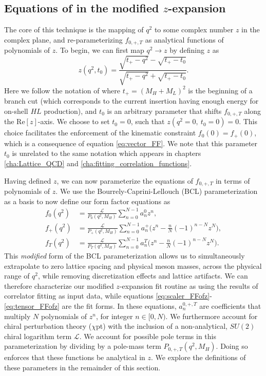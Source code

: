 \subsection{Equations of in the modified $z$-expansion}
The core of this technique is the mapping of $q^2$ to some complex number $z$ in the complex plane, and re-parameterizing $f_{0,+,T}$ as analytical functions of polynomials of $z$.  To begin, we can first map $q^2\rightarrow z$ by defining $z$ as 
\begin{equation}\label{eq:zofq}
  z(q^2,t_0)=\frac{\sqrt{t_+-q^2}-\sqrt{t_+-t_0}}{\sqrt{t_+-q^2}+\sqrt{t_+-t_0}}.
\end{equation}
Here we follow the notation of \cite{boyd1995modelindependentdeterminationsb, PhysRevD.79.013008, PhysRevLett.95.071802} where $t_+ = (M_H + M_L)^2$ is the beginning of a branch cut (which corresponds to the current insertion having enough energy for on-shell $HL$ production), and $t_0$ is an arbitrary parameter that shifts $f_{0,+,T}$ along the $\mathrm{Re}[z]$-axis.  We choose to set $t_0 = 0$, such that $z(q^2 = 0, \ t_0=0) = 0$.  This choice facilitates the enforcement of the kinematic constraint $f_0(0) = f_+(0)$, which is a consequence of equation \ref{eq:vector_FF}.  We note that this parameter $t_0$ is unrelated to the same notation which appears in chapters \ref{cha:Lattice_QCD} and \ref{cha:fitting_correlation_functions}.

Having defined $z$, we can now parameterize the equations of $f_{0,+,T}$ in terms of polynomials of $z$.  We use the Bourrely-Caprini-Lellouch (BCL) parameterization \cite{PhysRevD.79.013008} as a basis to now define our form factor equations as
  \begin{align}\label{eq:scaler_FFofz}
    f_0(q^2)&=\frac{\mathcal{L}}{P_0(q^2,M_H)}\sum_{n=0}^{N-1}a_n^0z^n,\\
    \label{eq:vector_FFofz}f_+(q^2)&=\frac{\mathcal{L}}{P_+(q^2,M_H)}\sum_{n=0}^{N-1}a_n^+\Big(z^n-\frac{n}{N}(-1)^{n-N}z^N\Big),\\
     \label{eq:tensor_FFofz}f_T(q^2)&=\frac{\mathcal{L}}{P_T(q^2,M_H)}\sum_{n=0}^{N-1}a_n^T\Big(z^n-\frac{n}{N}(-1)^{n-N}z^N\Big).
\end{align}
This \textit{modified} form of the BCL parameterization allows us to simultaneously extrapolate to zero lattice spacing and physical meson masses, across the physical range of $q^2$, while removing discretization effects and lattice artifacts.  We can therefore characterize our modified $z$-expansion fit routine as using the results of correlator fitting as input data, while equations \ref{eq:scaler_FFofz}-\ref{eq:tensor_FFofz} are the fit forms. In these equations, $a_n^{0,+,T}$ are coefficients that multiply $N$ polynomials of $z^n$, for integer $n\in[0,N)$.  We furthermore account for chiral perturbation theory ($\chi$pt) with the inclusion of a non-analytical, $SU(2)$ chiral logarithm term $\mathcal{L}$.  We account for possible pole terms in this parameterization by dividing by a pole-mass term $P_{0,+,T}(q^2,M_H)$.  Doing so enforces that these functions be analytical in $z$.  We explore the definitions of these parameters in the remainder of this section.    

